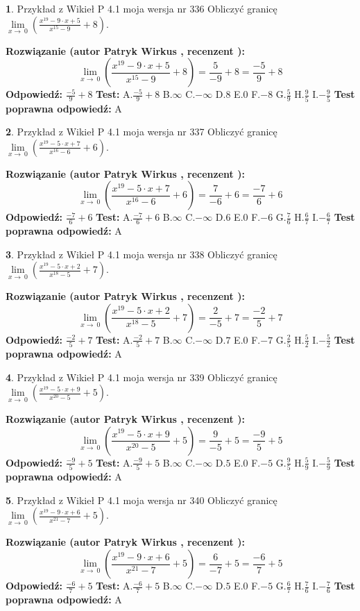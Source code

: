 \documentclass[12pt, a4paper]{article}
\theoremstyle{definition} %
\newtheorem{zad}{}
\newcommand{\zadStart}[1]{\begin{zad}#1\newline}
\newcommand{\zadStop}{\end{zad}}
\newcommand{\rozwStart}[2]{\noindent \textbf{Rozwiązanie (autor #1 , recenzent #2): }\newline}
\newcommand{\rozwStop}{\newline}
\newcommand{\odpStart}{\noindent \textbf{Odpowiedź:}\newline}
\newcommand{\odpStop}{\newline}
\newcommand{\testStart}{\noindent \textbf{Test:}\newline}
\newcommand{\testStop}{\newline}
\newcommand{\kluczStart}{\noindent \textbf{Test poprawna odpowiedź:}\newline}
\newcommand{\kluczStop}{\newline}
\begin{document}
\zadStart{Przykład z Wikieł P 4.1 moja wersja nr 336}
Obliczyć granicę $\lim\limits_{x\to\ 0}(\frac{x^{19}-9 \cdot x +5}{x^{15}-9}+8)$.
\zadStop
\rozwStart{Patryk Wirkus}{}
$$\lim\limits_{x\to\ 0}(\frac{x^{19}-9 \cdot x +5}{x^{15}-9}+8)=\frac{5}{-9}+8=\frac{-5}{9}+8$$
\rozwStop
\odpStart
$\frac{-5}{9}+8$
\odpStop
\testStart
A.$\frac{-5}{9}+8$
B.$\infty$
C.$-\infty$
D.$8$
E.$0$
F.$-8$
G.$\frac{5}{9}$
H.$\frac{9}{5}$
I.$-\frac{9}{5}$
\testStop
\kluczStart
A
\kluczStop



\zadStart{Przykład z Wikieł P 4.1 moja wersja nr 337}
Obliczyć granicę $\lim\limits_{x\to\ 0}(\frac{x^{19}-5 \cdot x +7}{x^{16}-6}+6)$.
\zadStop
\rozwStart{Patryk Wirkus}{}
$$\lim\limits_{x\to\ 0}(\frac{x^{19}-5 \cdot x +7}{x^{16}-6}+6)=\frac{7}{-6}+6=\frac{-7}{6}+6$$
\rozwStop
\odpStart
$\frac{-7}{6}+6$
\odpStop
\testStart
A.$\frac{-7}{6}+6$
B.$\infty$
C.$-\infty$
D.$6$
E.$0$
F.$-6$
G.$\frac{7}{6}$
H.$\frac{6}{7}$
I.$-\frac{6}{7}$
\testStop
\kluczStart
A
\kluczStop



\zadStart{Przykład z Wikieł P 4.1 moja wersja nr 338}
Obliczyć granicę $\lim\limits_{x\to\ 0}(\frac{x^{19}-5 \cdot x +2}{x^{18}-5}+7)$.
\zadStop
\rozwStart{Patryk Wirkus}{}
$$\lim\limits_{x\to\ 0}(\frac{x^{19}-5 \cdot x +2}{x^{18}-5}+7)=\frac{2}{-5}+7=\frac{-2}{5}+7$$
\rozwStop
\odpStart
$\frac{-2}{5}+7$
\odpStop
\testStart
A.$\frac{-2}{5}+7$
B.$\infty$
C.$-\infty$
D.$7$
E.$0$
F.$-7$
G.$\frac{2}{5}$
H.$\frac{5}{2}$
I.$-\frac{5}{2}$
\testStop
\kluczStart
A
\kluczStop



\zadStart{Przykład z Wikieł P 4.1 moja wersja nr 339}
Obliczyć granicę $\lim\limits_{x\to\ 0}(\frac{x^{19}-5 \cdot x +9}{x^{20}-5}+5)$.
\zadStop
\rozwStart{Patryk Wirkus}{}
$$\lim\limits_{x\to\ 0}(\frac{x^{19}-5 \cdot x +9}{x^{20}-5}+5)=\frac{9}{-5}+5=\frac{-9}{5}+5$$
\rozwStop
\odpStart
$\frac{-9}{5}+5$
\odpStop
\testStart
A.$\frac{-9}{5}+5$
B.$\infty$
C.$-\infty$
D.$5$
E.$0$
F.$-5$
G.$\frac{9}{5}$
H.$\frac{5}{9}$
I.$-\frac{5}{9}$
\testStop
\kluczStart
A
\kluczStop



\zadStart{Przykład z Wikieł P 4.1 moja wersja nr 340}
Obliczyć granicę $\lim\limits_{x\to\ 0}(\frac{x^{19}-9 \cdot x +6}{x^{21}-7}+5)$.
\zadStop
\rozwStart{Patryk Wirkus}{}
$$\lim\limits_{x\to\ 0}(\frac{x^{19}-9 \cdot x +6}{x^{21}-7}+5)=\frac{6}{-7}+5=\frac{-6}{7}+5$$
\rozwStop
\odpStart
$\frac{-6}{7}+5$
\odpStop
\testStart
A.$\frac{-6}{7}+5$
B.$\infty$
C.$-\infty$
D.$5$
E.$0$
F.$-5$
G.$\frac{6}{7}$
H.$\frac{7}{6}$
I.$-\frac{7}{6}$
\testStop
\kluczStart
A
\kluczStop
\end{document}
